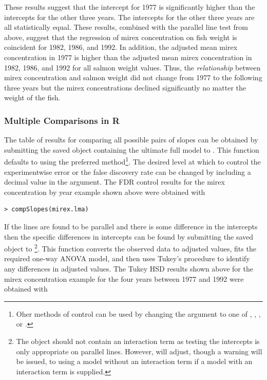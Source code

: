 \documentclass[10pt,openany]{book}\usepackage[]{graphicx}\usepackage[]{color}
\makeatletter
\newenvironment{kframe}{%
 \def\at@end@of@kframe{}%
 \ifinner\ifhmode%
  \def\at@end@of@kframe{\end{minipage}}%
  \begin{minipage}{\columnwidth}%
 \fi\fi%
 \def\FrameCommand##1{\hskip\@totalleftmargin \hskip-\fboxsep
 \colorbox{shadecolor}{##1}\hskip-\fboxsep
     \hskip-\linewidth \hskip-\@totalleftmargin \hskip\columnwidth}%
 \MakeFramed {\advance\hsize-\width
   \@totalleftmargin\z@ \linewidth\hsize
   \@setminipage}}%
 {\par\unskip\endMakeFramed%
 \at@end@of@kframe}
\newenvironment{knitrout}{}{} %
\makeatother
\begin{document}
These results suggest that the intercept for 1977 is significantly higher than the intercepts for the other three years. The intercepts for the other three years are all statistically equal.  These results, combined with the parallel line test from above, suggest that the regression of mirex concentration on fish weight is coincident for 1982, 1986, and 1992.  In addition, the adjusted mean mirex concentration in 1977 is higher than the adjusted mean mirex concentration in 1982, 1986, and 1992 for all salmon weight values.  Thus, the \emph{relationship} between mirex concentration and salmon weight did not change from 1977 to the following three years but the mirex concentrations declined significantly no matter the weight of the fish.

\subsubsection*{Multiple Comparisons in R}
The table of results for comparing all possible pairs of slopes can be obtained by submitting the saved  object containing the ultimate full model to .  This function defaults to using the preferred  method\footnote{Oher methods of control can be used by changing the  argument to one of , , , or .}.  The desired level at which to control the experimentwise error or the false discovery rate can be changed by including a decimal value in the  argument.  The FDR control results for the mirex concentration by year example shown above were obtained with

\begin{knitrout}
\color{fgcolor}\begin{kframe}
\begin{verbatim}
> compSlopes(mirex.lma)
\end{verbatim}
\end{kframe}
\end{knitrout}

If the lines are found to be parallel and there is some difference in the intercepts then the specific differences in intercepts can be found by submitting the saved  object to \footnote{The  object should not contain an interaction term as testing the intercepts is only appropriate on parallel lines.  However,  will adjust, though a warning will be issued, to using a model without an interaction term if a model with an interaction term is supplied.}.  This function converts the observed data to adjusted values, fits the required one-way ANOVA model, and then uses Tukey's procedure to identify any differences in adjusted values.  The Tukey HSD results shown above for the mirex concentration example for the four years between 1977 and 1992 were obtained with
\end{document}
